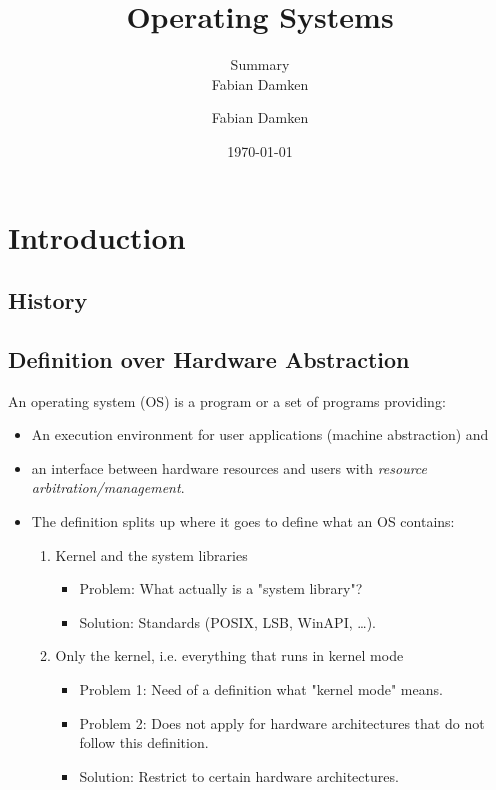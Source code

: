 \documentclass[a4paper, 11pt, accentcolor = tud3b]{tudreport}
\title{Operating Systems}
\subtitle{Summary \\ Fabian Damken}
\author{Fabian Damken}
\date{\today}
\begin{document}
    \maketitle
    \tableofcontents
    \listoftodos

    \chapter{Introduction}
        \section{History} %

        \section{Definition over Hardware Abstraction}
            An operating system (OS) is a program or a set of programs providing:
            \begin{itemize}
            	\item An execution environment for user applications (machine abstraction) and
            	\item an interface between hardware resources and users with \textit{resource arbitration/management}.
            	\item The definition splits up where it goes to define what an OS contains:
	            	\begin{enumerate}
	            		\item Kernel and the system libraries
		            		\begin{itemize}
		            			\item Problem: What actually is a "system library"?
		            			\item Solution: Standards (POSIX, LSB, WinAPI, \dots).
		            		\end{itemize}
	            		\item Only the kernel, i.e. everything that runs in kernel mode
		            		\begin{itemize}
		            			\item Problem 1: Need of a definition what "kernel mode" means.
		            			\item Problem 2: Does not apply for hardware architectures that do not follow this definition.
		            			\item Solution: Restrict to certain hardware architectures.
		            		\end{itemize}
	            	\end{enumerate}
            \end{itemize}
\end{document}
